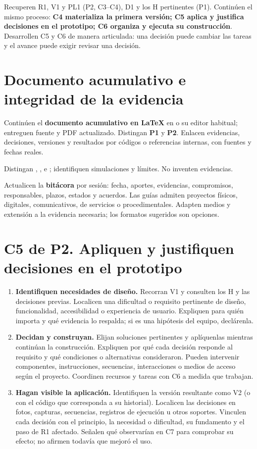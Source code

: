 Recuperen R1, V1 y PL1 (P2, C3--C4), D1 y los H pertinentes (P1). Continúen el mismo proceso: \textbf{C4 materializa la primera versión; C5 aplica y justifica decisiones en el prototipo; C6 organiza y ejecuta su construcción}. Desarrollen C5 y C6 de manera articulada: una decisión puede cambiar las tareas y el avance puede exigir revisar una decisión.

\section*{Documento acumulativo e integridad de la evidencia}
Continúen el \textbf{documento acumulativo en LaTeX} en  o su editor habitual; entreguen fuente y PDF actualizado. Distingan \textbf{P1} y \textbf{P2}. Enlacen evidencias, decisiones, versiones y resultados por códigos o referencias internas, con fuentes y fechas reales.

Distingan , ,  e ; identifiquen simulaciones y límites.  No inventen evidencias.

Actualicen la \textbf{bitácora} por sesión: fecha, aportes, evidencias, compromisos, responsables, plazos, estados y acuerdos. Las guías admiten proyectos físicos, digitales, comunicativos, de servicios o procedimentales. Adapten medios y extensión a la evidencia necesaria; los formatos sugeridos son opciones.

\section*{C5 de P2. Apliquen y justifiquen decisiones en el prototipo}
\begin{enumerate}[series=pasos]
\item \textbf{Identifiquen necesidades de diseño.} Recorran V1 y consulten los H y las decisiones previas. Localicen una dificultad o requisito pertinente de diseño, funcionalidad, accesibilidad o experiencia de usuario. Expliquen para quién importa y qué evidencia lo respalda; si es una hipótesis del equipo, declárenla.
\item \textbf{Decidan y construyan.} Elijan soluciones pertinentes y aplíquenlas mientras continúan la construcción. Expliquen por qué cada decisión responde al requisito y qué condiciones o alternativas consideraron. Pueden intervenir componentes, instrucciones, secuencias, interacciones o medios de acceso según el proyecto. Coordinen recursos y tareas con C6 a medida que trabajan.
\item \textbf{Hagan visible la aplicación.} Identifiquen la versión resultante como V2 (o con el código que corresponda a su historial). Localicen las decisiones en fotos, capturas, secuencias, registros de ejecución u otros soportes. Vinculen cada decisión con el principio, la necesidad o dificultad, su fundamento y el paso de R1 afectado. Señalen qué observarían en C7 para comprobar su efecto; no afirmen todavía que mejoró el uso.
\end{enumerate}

